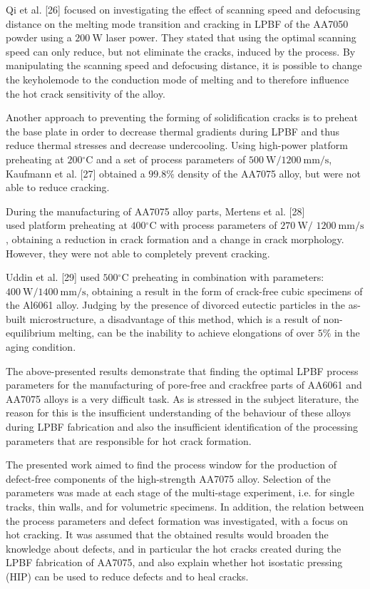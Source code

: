 \documentclass[10pt]{article}
\begin{document}
Qi et al. [26] focused on investigating the effect of scanning speed and defocusing distance on the melting mode transition and cracking in LPBF of the AA7050 powder using a $200 \mathrm{~W}$ laser power. They stated that using the optimal scanning speed can only reduce, but not eliminate the cracks, induced by the process. By manipulating the scanning speed and defocusing distance, it is possible to change the keyholemode to the conduction mode of melting and to therefore influence the hot crack sensitivity of the alloy.

Another approach to preventing the forming of solidification cracks is to preheat the base plate in order to decrease thermal gradients during LPBF and thus reduce thermal stresses and decrease undercooling. Using high-power platform preheating at $200{ }^{\circ} \mathrm{C}$ and a set of process parameters of $500 \mathrm{~W} / 1200 \mathrm{~mm} / \mathrm{s}$, Kaufmann et al. [27] obtained a $99.8 \%$ density of the AA7075 alloy, but were not able to reduce cracking.

During the manufacturing of AA7075 alloy parts, Mertens et al. [28]\\
used platform preheating at $400{ }^{\circ} \mathrm{C}$ with process parameters of $270 \mathrm{~W} /$ $1200 \mathrm{~mm} / \mathrm{s}$, obtaining a reduction in crack formation and a change in crack morphology. However, they were not able to completely prevent cracking.

Uddin et al. [29] used $500{ }^{\circ} \mathrm{C}$ preheating in combination with parameters: $400 \mathrm{~W} / 1400 \mathrm{~mm} / \mathrm{s}$, obtaining a result in the form of crack-free cubic specimens of the Al6061 alloy. Judging by the presence of divorced eutectic particles in the as-built microstructure, a disadvantage of this method, which is a result of non-equilibrium melting, can be the inability to achieve elongations of over $5 \%$ in the aging condition.

The above-presented results demonstrate that finding the optimal LPBF process parameters for the manufacturing of pore-free and crackfree parts of AA6061 and AA7075 alloys is a very difficult task. As is stressed in the subject literature, the reason for this is the insufficient understanding of the behaviour of these alloys during LPBF fabrication and also the insufficient identification of the processing parameters that are responsible for hot crack formation.

The presented work aimed to find the process window for the production of defect-free components of the high-strength AA7075 alloy. Selection of the parameters was made at each stage of the multi-stage experiment, i.e. for single tracks, thin walls, and for volumetric specimens. In addition, the relation between the process parameters and defect formation was investigated, with a focus on hot cracking. It was assumed that the obtained results would broaden the knowledge about defects, and in particular the hot cracks created during the LPBF fabrication of AA7075, and also explain whether hot isostatic pressing (HIP) can be used to reduce defects and to heal cracks.
\end{document}
